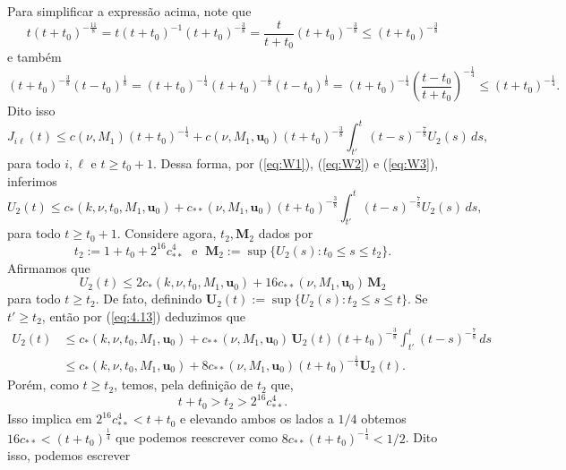 \documentclass[a4paper, 11pt]{book}
\theoremstyle{definition}
\newcommand{\bu}{\mathbf{u}}
\begin{document}
\begin{prf}
\[    \]
    Para simplificar a expressão acima, note que
    \[
        t(t + t_0)^{-\frac{11}{8}} = t(t + t_0)^{-1} (t+t_0)^{-\frac{3}{8}} = \frac{t}{t + t_0} (t + t_0)^{-\frac{3}{8}} \leqslant (t + t_0)^{-\frac{3}{8}}
    \]
    e também
    \[
        (t + t_0)^{-\frac{3}{8}} (t - t_0)^{\frac{1}{8}} = (t + t_0)^{-\frac{1}{4}} (t + t_0)^{-\frac{1}{8}} (t - t_0)^{\frac{1}{8}} = (t + t_0)^{-\frac{1}{4}} \left( \frac{t - t_0}{t+t_0} \right)^{-\frac{1}{4}} \leqslant (t + t_0)^{-\frac{1}{4}}.
    \]
    Dito isso
    \begin{equation} \label{eq:W3}
        J_{i\ell}(t) \leqslant c(\nu, M_1) (t + t_0)^{-\frac{1}{4}} + c(\nu,M_1, \bu_0) (t+t_0)^{-\frac{3}{8}} \int_{t'}^t (t - s)^{-\frac{7}{8}} U_2(s)\,ds,
    \end{equation}
    para todo $i, \ell$ e $t \geqslant t_0 + 1$. Dessa forma, por (\ref{eq:W1}), (\ref{eq:W2}) e (\ref{eq:W3}), inferimos
    \begin{equation} \label{eq:4.13}
        U_2(t) \leqslant c_* (k, \nu, t_0, M_1, \bu_0) + c_{**} (\nu, M_1, \bu_0)(t + t_0)^{-\frac{3}{8}} \int_{t'}^t (t-s)^{-\frac{7}{8}} U_2(s) \,ds,
    \end{equation}
    para todo $ t \geqslant t_0 + 1$.
    Considere agora, $t_2, \mathbf{M}_2$ dados por
    \[
        t_2 := 1 + t_0 + 2^{16}c_{**}^4 \;\text{ e }\; \mathbf{M}_2 := \sup \{ U_2(s) : t_0 \leqslant  s \leqslant t_2\}.
    \]
    Afirmamos que
    \begin{equation} \label{eq:W5}
        U_2(t) \leqslant 2 c_* (k,\nu,t_0,M_1,\bu_0) + 16 c_{**}(\nu,M_1,\bu_0) \, \mathbf{M}_2
    \end{equation}
    para todo $t\geqslant t_2$.
    De fato, definindo $\mathbf{U}_2(t) := \sup\{ U_2(s): t_2 \leqslant s \leqslant t\}$.
    Se $t' \geqslant t_2$, então por (\ref{eq:4.13}) deduzimos que
    \[
        \begin{aligned}
            U_2(t) &\leqslant c_* (k, \nu, t_0, M_1, \bu_0) + c_{**} (\nu,M_1, \bu_0) \, \mathbf{U}_2(t) (t + t_0)^{-\frac{3}{8}} \int_{t'}^t (t -s)^{-\frac{7}{8}} \,ds\\
            &\leqslant c_* (k, \nu, t_0, M_1, \bu_0) + 8c_{**} (\nu,M_1, \bu_0) (t + t_0)^{-\frac{1}{4}}\mathbf{U}_2(t). 
        \end{aligned}
    \]
    Porém, como $t \geqslant t_2$, temos, pela definição de $t_2$ que,
    \[
        t + t_0 > t_2 > 2^{16} c_{**}^4.
    \]
    Isso implica em $2^{16} c_{**}^4 < t + t_0$ e elevando ambos os lados a $1/4$ obtemos $16 c_{**} < (t + t_0)^{\frac{1}{4}}$ que podemos reescrever como $8c_{**} (t + t_0)^{-\frac{1}{4}} < 1/2$. Dito isso, podemos escrever

\end{prf}
\end{document}

